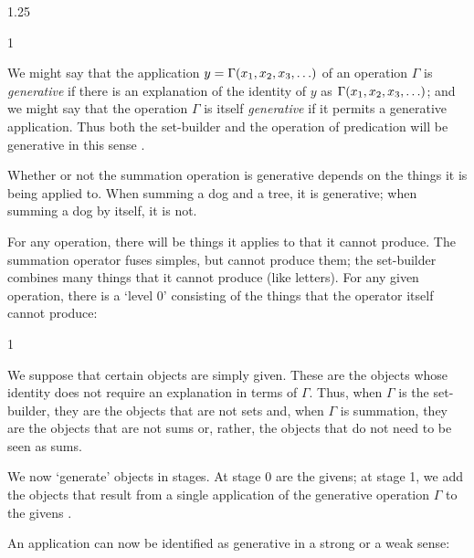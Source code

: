 \documentclass[11pt]{article}
\newenvironment{squote}{%
\begin{spacing}{1}
       	\begin{list}{}{%
\setlength{\labelwidth}{0pt}%
\rightmargin\leftmargin%
}
\item\relax
}{%
\end{list}%
\end{spacing}
}
\begin{document}
\begin{spacing}{1.25}
\begin{squote}
We might say that the application $y = \Gamma (x_1, x_2, x_3,
\mathellipsis )$ of an operation $\Gamma$ is {\em generative} if there
is an explanation of the identity of $y$ as $\Gamma (x_1, x_2, x_3,
\mathellipsis )$; and we might say that the operation $\Gamma$ is
itself {\em generative} if it permits a generative application. Thus
both the set-builder and the operation of predication will be
generative in this sense \citeyearpar[582]{fine2010}.
\end{squote}

Whether or not the summation operation is generative depends on the
things it is being applied to.  When summing a dog and a tree, it is
generative; when summing a dog by itself, it is not.

For any operation, there will be things it applies to that it cannot
produce.  The summation operator fuses simples, but cannot produce
them; the set-builder combines many things that it cannot produce
(like letters).  For any given operation, there is a `level 0'
consisting of the things that the operator itself cannot produce:

\begin{squote}
We suppose that certain objects are simply given.  These are the
objects whose identity does not require an explanation in terms of
$\Gamma$.  Thus, when $\Gamma$ is the set-builder, they are the
objects that are not sets and, when $\Gamma$ is summation, they are
the objects that are not sums or, rather, the objects that do not need
to be seen as sums.

We now `generate' objects in stages.  At stage 0 are the givens; at
stage 1, we add the objects that result from a single application of
the generative operation $\Gamma$ to the givens \citep[583]{fine2010}.
\end{squote}

An application can now be identified as generative in a strong or a
weak sense:


\end{spacing}
\end{document}
